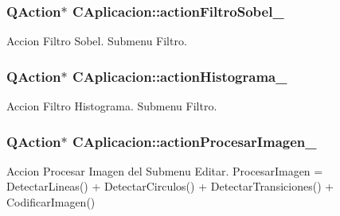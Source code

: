 \subsubsection[{\texorpdfstring{action\+Filtro\+Sobel\+\_\+}{actionFiltroSobel_}}]{\setlength{\rightskip}{0pt plus 5cm}Q\+Action$\ast$ C\+Aplicacion\+::action\+Filtro\+Sobel\+\_\+\hspace{0.3cm}{\ttfamily [private]}}\hypertarget{classCAplicacion_a96511c94f6a4a6da0466d460272f56bf}{}\label{classCAplicacion_a96511c94f6a4a6da0466d460272f56bf}


Accion Filtro Sobel. Submenu Filtro. 

\subsubsection[{\texorpdfstring{action\+Histograma\+\_\+}{actionHistograma_}}]{\setlength{\rightskip}{0pt plus 5cm}Q\+Action$\ast$ C\+Aplicacion\+::action\+Histograma\+\_\+\hspace{0.3cm}{\ttfamily [private]}}\hypertarget{classCAplicacion_a60f0707037ad02949ff17858729faff2}{}\label{classCAplicacion_a60f0707037ad02949ff17858729faff2}


Accion Filtro Histograma. Submenu Filtro. 

\subsubsection[{\texorpdfstring{action\+Procesar\+Imagen\+\_\+}{actionProcesarImagen_}}]{\setlength{\rightskip}{0pt plus 5cm}Q\+Action$\ast$ C\+Aplicacion\+::action\+Procesar\+Imagen\+\_\+\hspace{0.3cm}{\ttfamily [private]}}\hypertarget{classCAplicacion_a9fa952c19f9da356432fae60a40cdced}{}\label{classCAplicacion_a9fa952c19f9da356432fae60a40cdced}


Accion Procesar Imagen del Submenu Editar. Procesar\+Imagen = Detectar\+Lineas() + Detectar\+Circulos() + Detectar\+Transiciones() + Codificar\+Imagen() 

